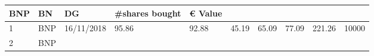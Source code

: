 \documentclass[
  11pt,
]{article}
\begin{document}
\begin{longtable}[]{@{}llllllllll@{}}
\begin{minipage}[b]{0.07\columnwidth}
BNP\strut
\end{minipage} & \begin{minipage}[b]{0.07\columnwidth}\raggedright
BN\strut
\end{minipage} & \begin{minipage}[b]{0.07\columnwidth}\raggedright
DG\strut
\end{minipage} & \begin{minipage}[b]{0.08\columnwidth}\raggedright
\#shares bought\strut
\end{minipage} & \begin{minipage}[b]{0.09\columnwidth}\raggedright
€ Value\strut
\end{minipage}\tabularnewline
\midrule
\endhead
\begin{minipage}[t]{0.05\columnwidth}\raggedright
1\strut
\end{minipage} & \begin{minipage}[t]{0.07\columnwidth}\raggedright
BNP\strut
\end{minipage} & \begin{minipage}[t]{0.11\columnwidth}\raggedright
16/11/2018\strut
\end{minipage} & \begin{minipage}[t]{0.07\columnwidth}\raggedright
95.86\strut
\end{minipage} & \begin{minipage}[t]{0.07\columnwidth}\raggedright
92.88\strut
\end{minipage} & \begin{minipage}[t]{0.07\columnwidth}\raggedright
45.19\strut
\end{minipage} & \begin{minipage}[t]{0.07\columnwidth}\raggedright
65.09\strut
\end{minipage} & \begin{minipage}[t]{0.07\columnwidth}\raggedright
77.09\strut
\end{minipage} & \begin{minipage}[t]{0.08\columnwidth}\raggedright
221.26\strut
\end{minipage} & \begin{minipage}[t]{0.09\columnwidth}\raggedright
10000\strut
\end{minipage}\tabularnewline
\begin{minipage}[t]{0.05\columnwidth}\raggedright
2\strut
\end{minipage} & \begin{minipage}[t]{0.07\columnwidth}\raggedright
BNP\strut
\end{minipage} & \begin{minipage}[t]{0.11\columnwidth}\raggedright

\end{minipage}
\end{longtable}
\end{document}
